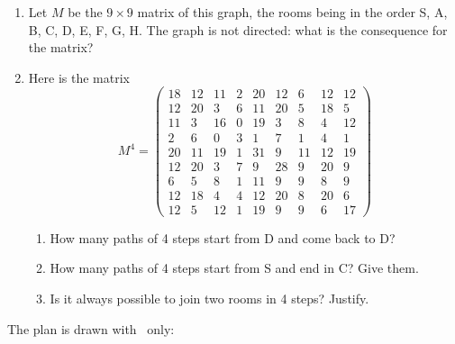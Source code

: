 \begin{enumerate}
   \begin{enumerate}
   \item Draw a graph modeling this situation.
   \item Is it possible to visit the museum using each door once and only
         once? Justify with a theorem of the course.
   \item The curator wants each room to have a carpet different from the
         carpets of the neighboring rooms (rooms joined by a door). What is
         the minimum number of kinds of carpet? Justify.
   \end{enumerate}
\item Let $M$ be the $9\times 9$ matrix of this graph, the rooms being in the
      order S, A, B, C, D, E, F, G, H. The graph is not directed: what is the
      consequence for the matrix?
\item Here is the matrix
\[M^4 =
\begin{pmatrix}
18 & 12 & 11 & 2 & 20 & 12 & 6 & 12 & 12\\
12 & 20 & 3 & 6 & 11 & 20 & 5 & 18 & 5\\
11 & 3 & 16 & 0 & 19 & 3 & 8 & 4 & 12\\
2 & 6 & 0 & 3 & 1 & 7 & 1 & 4 & 1\\
20 & 11 & 19 & 1 & 31 & 9 & 11 & 12 & 19\\
12 & 20 & 3 & 7 & 9 & 28 & 9 & 20 & 9\\
6 & 5 & 8 & 1 & 11 & 9 & 9 & 8 & 9\\
12 & 18 & 4 & 4 & 12 & 20 & 8 & 20 & 6\\
12 & 5 & 12 & 1 & 19 & 9 & 9 & 6 & 17
\end{pmatrix}\]
   \begin{enumerate}
   \item How many paths of 4 steps start from D and come back to D?
   \item How many paths of 4 steps start from S and end in C? Give them.
   \item Is it always possible to join two rooms in 4 steps? Justify.
   \end{enumerate}
\end{enumerate}

\newpage
The plan is drawn with \TIKZ\ only:

\begin{tkzexample}
\end{tkzexample}

